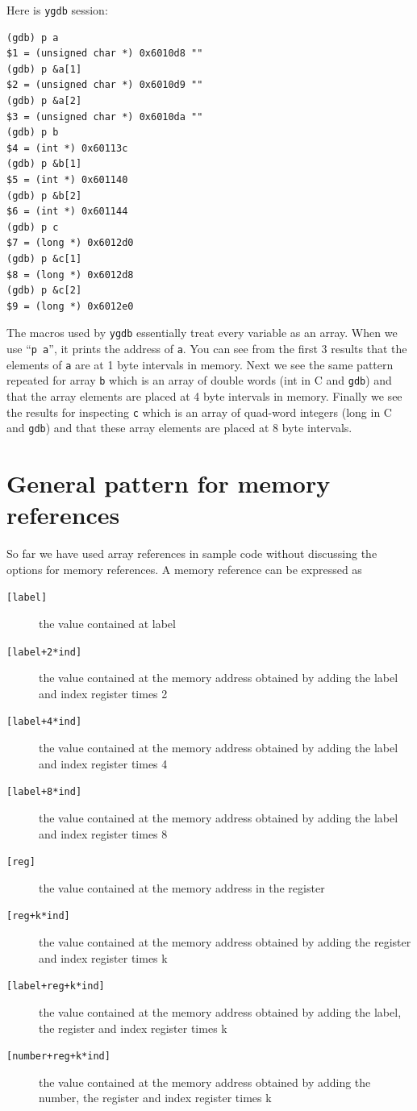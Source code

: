 \documentclass[11pt,b5paper]{book}
\begin{document}
Here is {\tt ygdb} session:
\begin{verbatim}
(gdb) p a
$1 = (unsigned char *) 0x6010d8 ""
(gdb) p &a[1]
$2 = (unsigned char *) 0x6010d9 ""
(gdb) p &a[2]
$3 = (unsigned char *) 0x6010da ""
(gdb) p b
$4 = (int *) 0x60113c
(gdb) p &b[1]
$5 = (int *) 0x601140
(gdb) p &b[2]
$6 = (int *) 0x601144
(gdb) p c
$7 = (long *) 0x6012d0
(gdb) p &c[1]
$8 = (long *) 0x6012d8
(gdb) p &c[2]
$9 = (long *) 0x6012e0
\end{verbatim}

The macros used by {\tt ygdb} essentially treat every variable as an array.
When we use ``{\tt p a}'', it prints the address of {\tt a}.
You can see from the first 3 results that the elements of {\tt a} are at 1 byte
intervals in memory.
Next we see the same pattern repeated for array {\tt b} which is an array of
double words (int in C and {\tt gdb}) and that the array elements are placed
at 4 byte intervals in memory.
Finally we see the results for inspecting {\tt c} which is an array of quad-word
integers (long in C and {\tt gdb}) and that these array elements are placed at
8 byte intervals.

\section{General pattern for memory references}

So far we have used array references in sample code without discussing the options for memory references.
A memory reference can be expressed as

\begin{description}
 \item [{\tt [label]}] the value contained at label
 \item [{\tt [label+2*ind]}] the value contained at the memory address obtained by adding the label and index register times 2
 \item [{\tt [label+4*ind]}] the value contained at the memory address obtained by adding the label and index register times 4
 \item [{\tt [label+8*ind]}] the value contained at the memory address obtained by adding the label and index register times 8
 \item [{\tt [reg]}]   the value contained at the memory address in the register
 \item [{\tt [reg+k*ind]}] the value contained at the memory address obtained by adding the register and index register times k
 \item [{\tt [label+reg+k*ind]}] the value contained at the memory address obtained by adding the label,
       the register and index register times k
 \item [{\tt [number+reg+k*ind]}] the value contained at the memory address obtained by adding the number,
       the register and index register times k
\end{description}
\end{document}

